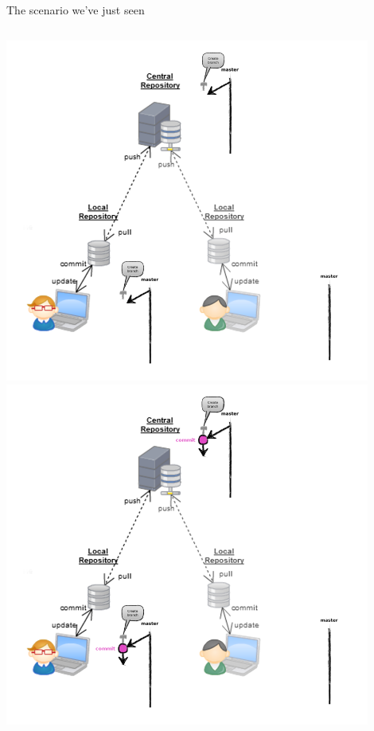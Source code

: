 \begin{frame}[fragile]{The scenario we've just seen}
\begin{columns}
\begin{column}{0.6\textwidth}
\begin{center}
{			}\only<2> {
				\includegraphics[width=0.9\textwidth]{multiuser_remote_branch}
			}\only<3> {
				\includegraphics[width=0.9\textwidth]{multiuser_push_branch}
			}\only<4> {
}
\end{center}
\end{column}
\end{columns}
\end{frame}
